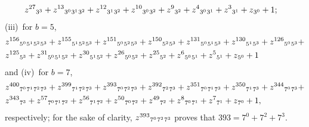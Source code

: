 \begin{example}
\begin{displaymath}
\begin{split}
&z^{27} {\space}_{3^{3}} + z^{13} {\space}_{3^{0}} {\space}_{3^{1}} {\space}_{3^{2}} + z^{12} {\space}_{3^{1}} {\space}_{3^{2}} + z^{10} {\space}_{3^{0}} {\space}_{3^{2}} + z^{9} {\space}_{3^{2}} + z^{4} {\space}_{3^{0}} {\space}_{3^{1}} + z^{3} {\space}_{3^{1}} + z {\space}_{3^{0}} + 1;
\end{split}
\end{displaymath}
(iii)~for $b=5$,
\begin{displaymath}
\begin{split}
&z^{156} {\space}_{5^{0}} {\space}_{5^{1}} {\space}_{5^{2}} {\space}_{5^{3}} + z^{155} {\space}_{5^{1}} {\space}_{5^{2}} {\space}_{5^{3}} + z^{151} {\space}_{5^{0}} {\space}_{5^{2}} {\space}_{5^{3}} + z^{150} {\space}_{5^{2}} {\space}_{5^{3}} + z^{131} {\space}_{5^{0}} {\space}_{5^{1}} {\space}_{5^{3}} + z^{130} {\space}_{5^{1}} {\space}_{5^{3}} + z^{126} {\space}_{5^{0}} {\space}_{5^{3}} + \\
&z^{125} {\space}_{5^{3}} + z^{31} {\space}_{5^{0}} {\space}_{5^{1}} {\space}_{5^{2}} + z^{30} {\space}_{5^{1}} {\space}_{5^{2}} + z^{26} {\space}_{5^{0}} {\space}_{5^{2}} + z^{25} {\space}_{5^{2}} + z^{6} {\space}_{5^{0}} {\space}_{5^{1}} + z^{5} {\space}_{5^{1}} + z {\space}_{5^{0}} + 1
\end{split}
\end{displaymath}
and (iv)~for $b=7$,
\begin{displaymath}
\begin{split}
&z^{400} {\space}_{7^{0}} {\space}_{7^{1}} {\space}_{7^{2}} {\space}_{7^{3}} + z^{399} {\space}_{7^{1}} {\space}_{7^{2}} {\space}_{7^{3}} + z^{393} {\space}_{7^{0}} {\space}_{7^{2}} {\space}_{7^{3}} + z^{392} {\space}_{7^{2}} {\space}_{7^{3}} + z^{351} {\space}_{7^{0}} {\space}_{7^{1}} {\space}_{7^{3}} + z^{350} {\space}_{7^{1}} {\space}_{7^{3}} + z^{344} {\space}_{7^{0}} {\space}_{7^{3}} + \\
&z^{343} {\space}_{7^{3}} + z^{57} {\space}_{7^{0}} {\space}_{7^{1}} {\space}_{7^{2}} + z^{56} {\space}_{7^{1}} {\space}_{7^{2}} + z^{50} {\space}_{7^{0}} {\space}_{7^{2}} + z^{49} {\space}_{7^{2}} + z^{8} {\space}_{7^{0}} {\space}_{7^{1}} + z^{7} {\space}_{7^{1}} + z {\space}_{7^{0}} + 1,
\end{split}
\end{displaymath}
respectively; for the sake of clarity, $z^{393} {\space}_{7^{0}} {\space}_{7^{2}}
{\space}_{7^{3}}$ proves that $393 = 7^{0} + 7^{2} + 7^{3}$.
\end{example}


